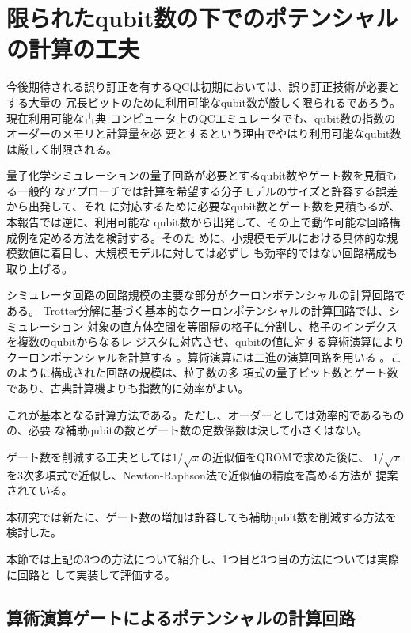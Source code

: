 \documentclass[fontsize=11pt]{jlreq}
\begin{document}
\section{限られたqubit数の下でのポテンシャルの計算の工夫}
今後期待される誤り訂正を有するQCは初期においては、誤り訂正技術が必要とする大量の
冗長ビットのために利用可能なqubit数が厳しく限られるであろう。現在利用可能な古典
コンピュータ上のQCエミュレータでも、qubit数の指数のオーダーのメモリと計算量を必
要とするという理由でやはり利用可能なqubit数は厳しく制限される。

量子化学シミュレーションの量子回路が必要とするqubit数やゲート数を見積もる一般的
なアプローチでは計算を希望する分子モデルのサイズと許容する誤差から出発して、それ
に対応するために必要なqubit数とゲート数を見積もるが、本報告では逆に、利用可能な
qubit数から出発して、その上で動作可能な回路構成例を定める方法を検討する。そのた
めに、小規模モデルにおける具体的な規模数値に着目し、大規模モデルに対しては必ずし
も効率的ではない回路構成も取り上げる。

シミュレータ回路の回路規模の主要な部分がクーロンポテンシャルの計算回路である。
Trotter分解に基づく基本的なクーロンポテンシャルの計算回路では、シミュレーション
対象の直方体空間を等間隔の格子に分割し、格子のインデクスを複数のqubitからなるレ
ジスタに対応させ、qubitの値に対する算術演算によりクーロンポテンシャルを計算する
\cite{Zalka-rspa.1998.0162}。算術演算には二進の演算回路を用いる
\cite{Vedral1996.PhysRevA.54.147}。このように構成された回路の規模は、粒子数の多
項式の量子ビット数とゲート数であり、古典計算機よりも指数的に効率がよい。

これが基本となる計算方法である。ただし、オーダーとしては効率的であるものの、必要
な補助qubitの数とゲート数の定数係数は決して小さくはない。

ゲート数を削減する工夫としては$1/\sqrt{x}$の近似値をQROMで求めた後に、
$1/\sqrt{x}$を3次多項式で近似し、Newton-Raphson法で近似値の精度を高める方法が
提案されている\cite{Rubin2024.pnas.2317772121}。

本研究では新たに、ゲート数の増加は許容しても補助qubit数を削減する方法を検討した。

本節では上記の3つの方法について紹介し、1つ目と3つ目の方法については実際に回路と
して実装して評価する。

\subsection{算術演算ゲートによるポテンシャルの計算回路}
\label{subsec:potential-circuit-by-arithmetic-gates}
\end{document}
